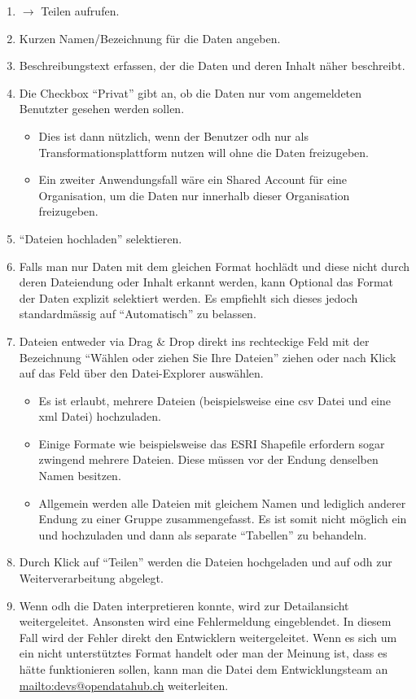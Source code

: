 \begin{enumerate}
\item {} $\to$ Teilen aufrufen.
\item Kurzen Namen/Bezeichnung für die Daten angeben.
\item Beschreibungstext erfassen, der die Daten und deren Inhalt näher beschreibt.
\item Die Checkbox ``Privat'' gibt an, ob die Daten nur vom angemeldeten Benutzter gesehen werden sollen.
	\begin{itemize}
	\item Dies ist dann nützlich, wenn der Benutzer \acl{odh} nur als Transformationsplattform nutzen will ohne die Daten freizugeben.
	\item Ein zweiter Anwendungsfall wäre ein Shared Account für eine Organisation, um die Daten nur innerhalb dieser Organisation freizugeben.
	\end{itemize}
\item ``Dateien hochladen'' selektieren.
\item Falls man nur Daten mit dem gleichen Format hochlädt und diese nicht durch deren Dateiendung oder Inhalt erkannt werden, kann Optional das Format der Daten explizit selektiert werden. Es empfiehlt sich dieses jedoch standardmässig auf ``Automatisch'' zu belassen.
\item Dateien entweder via Drag \& Drop direkt ins rechteckige Feld mit der Bezeichnung ``Wählen oder ziehen Sie Ihre Dateien'' ziehen oder nach Klick auf das Feld über den Datei-Explorer auswählen.
	\begin{itemize}
	\item Es ist erlaubt, mehrere Dateien (beispielsweise eine \acs{csv} Datei und eine \acs{xml} Datei) hochzuladen.
	\item Einige Formate wie beispielsweise das ESRI Shapefile erfordern sogar zwingend mehrere Dateien. Diese müssen vor der Endung denselben Namen besitzen.
	\item Allgemein werden alle Dateien mit gleichem Namen und lediglich anderer Endung zu einer Gruppe zusammengefasst. Es ist somit nicht möglich ein  und  hochzuladen und dann als separate ``Tabellen'' zu behandeln.
	\end{itemize}
\item Durch Klick auf ``Teilen'' werden die Dateien hochgeladen und auf \acl{odh} zur Weiterverarbeitung abgelegt.
\item Wenn \acl{odh} die Daten interpretieren konnte, wird zur Detailansicht weitergeleitet. Ansonsten wird eine Fehlermeldung eingeblendet. In diesem Fall wird der Fehler direkt den Entwicklern weitergeleitet. Wenn es sich um ein nicht unterstütztes Format handelt oder man der Meinung ist, dass es hätte funktionieren sollen, kann man die Datei dem Entwicklungsteam an \url{mailto:devs@opendatahub.ch} weiterleiten.
\end{enumerate}

